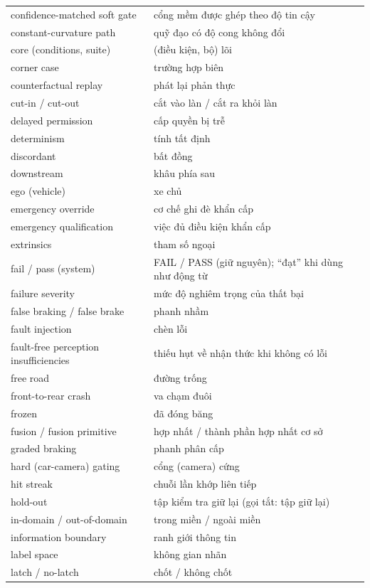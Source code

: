 \documentclass[11pt,a4paper]{article}
\begin{document}
\begin{longtable}{@{}p{}p{}@{}}
confidence-matched soft gate & cổng mềm được ghép theo độ tin cậy\\
constant-curvature path & quỹ đạo có độ cong không đổi\\
core (conditions, suite) & (điều kiện, bộ) lõi\\
corner case & trường hợp biên\\
counterfactual replay & phát lại phản thực\\
cut-in / cut-out & cắt vào làn / cắt ra khỏi làn\\
delayed permission & cấp quyền bị trễ\\
determinism & tính tất định\\
discordant & bất đồng\\
downstream & khâu phía sau\\
ego (vehicle) & xe chủ\\
emergency override & cơ chế ghi đè khẩn cấp\\
emergency qualification & việc đủ điều kiện khẩn cấp\\
extrinsics & tham số ngoại\\
fail / pass (system) & FAIL / PASS (giữ nguyên); “đạt” khi dùng như động từ\\
failure severity & mức độ nghiêm trọng của thất bại\\
false braking / false brake & phanh nhầm\\
fault injection & chèn lỗi\\
fault-free perception insufficiencies & thiếu hụt về nhận thức khi không có lỗi\\
free road & đường trống\\
front-to-rear crash & va chạm đuôi\\
frozen & đã đóng băng\\
fusion / fusion primitive & hợp nhất / thành phần hợp nhất cơ sở\\
graded braking & phanh phân cấp\\
hard (car-camera) gating & cổng (camera) cứng\\
hit streak & chuỗi lần khớp liên tiếp\\
hold-out & tập kiểm tra giữ lại (gọi tắt: tập giữ lại)\\
in-domain / out-of-domain & trong miền / ngoài miền\\
information boundary & ranh giới thông tin\\
label space & không gian nhãn\\
latch / no-latch & chốt / không chốt\\

\end{longtable}
\end{document}
